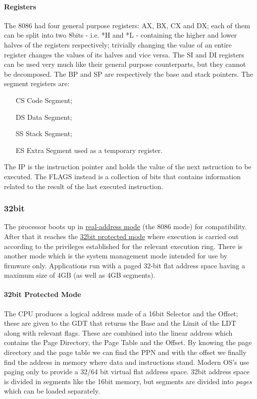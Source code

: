 \documentclass[paper=a4, fontsize=11pt]{report} %
\numberwithin{equation}{section} %
\numberwithin{figure}{section} %
\numberwithin{table}{section} %
\begin{document}
\paragraph{Registers}
The 8086 had four general purpose registers: AX, BX, CX and DX; each of them can be split into two 8bits - i.e. *H and *L -  containing the higher and lower halves of the registers respectively; trivially changing the value of an entire register changes the values of its halves and vice versa. The SI and DI registers can be used very much like their general purpose counterparts, but they cannot be decomposed. The BP and SP are respectively the base and stack pointers. The segment registers are:
\begin{itemize}
	\item[CS] Code Segment;
	\item[DS] Data Segment;
	\item[SS] Stack Segment;
	\item[ES] Extra Segment used as a temporary register. 
\end{itemize}
The IP is the instruction pointer and holds the value of the next nstruction to be executed. The FLAGS instead is a collection of bits that contains information related to the result of the last executed instruction.
\subsubsection{32bit}
The processor boots up in \underline{real-address mode} (the 8086 mode) for
compatibility. After that it reaches the \underline{32bit protected mode} where
execution is carried out according to the privileges established for the
relevant execution ring. There is another mode which is the system management
mode intended for use by firmware only. Applications run with a paged 32-bit
flat address space having a maximum size of 4GB (as well as 4GB segments).
\paragraph{32bit Protected Mode}
The CPU produces a logical address made of a 16bit Selector and the Offset; 
these are given to the GDT that returns the Base and the Limit of the LDT along 
with relevant flags. These are combined into the linear address which contains 
the Page Directory, the Page Table and the Offset. By knowing the page 
directory and the page table we can find the PPN and with the offset we 
finally find the address in memory where data and instructions stand.
Modern OS's use paging only to provide a 32/64 bit virtual flat address space.
32bit address space is divided in segments like the 16bit memory, but segments are divided into \textit{pages} which can be loaded separately.
\end{document}
